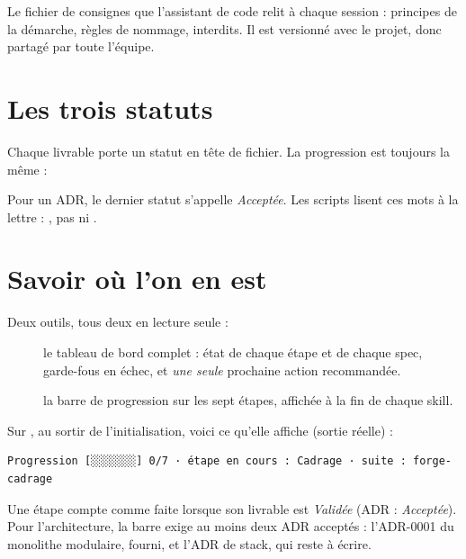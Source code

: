 \begin{concept}[AGENTS.md]
Le fichier de consignes que l'assistant de code relit à chaque session : principes de la démarche,
règles de nommage, interdits. Il est versionné avec le projet, donc partagé par toute l'équipe.
\end{concept}

\section{Les trois statuts}
Chaque livrable porte un statut en tête de fichier. La progression est toujours la même :

\begin{center}
\end{center}
Pour un ADR, le dernier statut s'appelle \emph{Acceptée}. Les scripts lisent ces mots à la lettre :
, pas  ni .

\section{Savoir où l'on en est}
Deux outils, tous deux en lecture seule :
\begin{description}
  \item[] le tableau de bord complet : état de chaque étape et de chaque spec, garde-fous en échec, et \emph{une seule} prochaine action recommandée.
  \item[] la barre de progression sur les sept étapes, affichée à la fin de chaque skill.
\end{description}
Sur \sika{}, au sortir de l'initialisation, voici ce qu'elle affiche (sortie réelle) :
\begin{code}
\begin{Verbatim}
Progression [░░░░░░░] 0/7 · étape en cours : Cadrage · suite : forge-cadrage
\end{Verbatim}
\end{code}
Une étape compte comme faite lorsque son livrable est \emph{Validée} (ADR : \emph{Acceptée}).
Pour l'architecture, la barre exige au moins deux ADR acceptés : l'ADR-0001 du monolithe modulaire,
fourni, et l'ADR de stack, qui reste à écrire.

